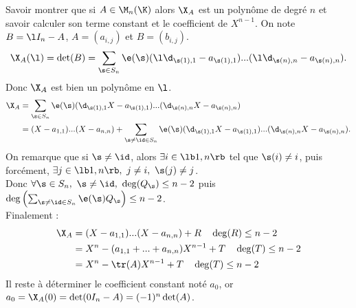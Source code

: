 \documentclass[french, 11pt]{article}
\begin{document}
\begin{exercice}{}{}
    Savoir montrer que si $A \in \M_n(\K)$ alors $\X_A$ est un polynôme de degré $n$ et savoir calculer son terme constant et le coefficient de $X^{n-1}$.
    \tcblower
    On note $B=\l I_n-A$, $A=(a_{i,j})$ et $B=(b_{i,j})$.
    \begin{equation*}
        \X_A(\l) = \det(B) = \sum_{\s \in S_n}\e(\s)(\l\d_{\s(1),1}-a_{\s(1),1})...(\l\d_{\s(n),n}-a_{\s(n),n}).
    \end{equation*}
    Donc $\X_A$ est bien un polynôme en $\l$.
    \begin{align*}
        \X_A&=\sum_{\s\in S_n}\e(\s)(\d_{\s(1),1}X-a_{\s(1),1})...(\d_{\s(n),n}X-a_{\s(n),n})\\
        &=(X-a_{1,1})...(X-a_{n,n}) + \sum_{\s\neq\id\in S_n}\e(\s)(\d_{\s(1),1}X-a_{\s(1),1})...(\d_{\s(n),n}X-a_{\s(n),n}).
    \end{align*}
    On remarque que si $\s\neq\id$, alors $\exists i \in \lb1,n\rb$ tel que $\s(i)\neq i$, puis forcément, $\exists j \in \lb1,n\rb, ~ j \neq i, ~ \s(j)\neq j$.\\
    Donc $\forall \s \in S_n, ~ \s\neq\id, ~ \deg(Q_\s)\leq n-2$ puis $\deg\left( \sum_{\s\neq\id\in S_n}\e(\s)Q_\s \right)\leq n-2$.\\
    Finalement :
    \begin{align*}
        \X_A &= (X-a_{1,1})...(X-a_{n,n})+R \quad \deg(R)\leq n-2\\
        &= X^n - (a_{1,1}+...+a_{n,n})X^{n-1} + T \quad \deg(T)\leq n-2\\
        &= X^n - \tr(A)X^{n-1} + T \quad \deg(T) \leq n-2
    \end{align*}
    Il reste à déterminer le coefficient constant noté $a_0$, or $a_0=\X_A(0)=\det(0I_n-A)=(-1)^n\det(A)$.
\end{exercice}
\end{document}
